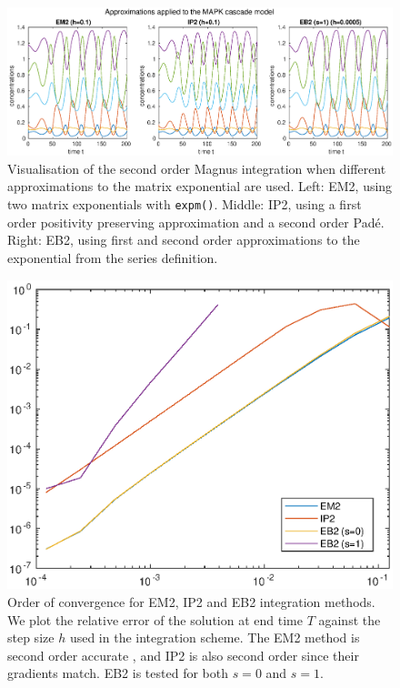 \begin{figure}
    \centering
    \includegraphics[width=\linewidth]{Matlab/magnustriplemapk.eps}
    \caption{
        Visualisation of the second order Magnus integration when different approximations to the matrix exponential are used.
        Left: EM2, using two matrix exponentials with \texttt{expm()}.
        Middle: IP2, using a first order positivity preserving approximation and a second order Pad\'e.
        Right: EB2, using first and second order approximations to the exponential from the series definition.
    }
    \label{fig:triplemagnus}
\end{figure}

\begin{figure}
    \centering
    \includegraphics[width=0.75\linewidth]{Matlab/magnusapproximations.eps}
    \caption{
        Order of convergence for EM2, IP2 and EB2 integration methods.
        We plot the relative error of the solution at end time $T$ against the step size $h$ used in the integration scheme.
        The EM2 method is second order accurate \cite{blanes_pos_2022},
        and IP2 is also second order since their gradients match.
        EB2 is tested for both $s=0$ and $s=1$.
    }
    \label{fig:magnusapprxorder}
\end{figure}

